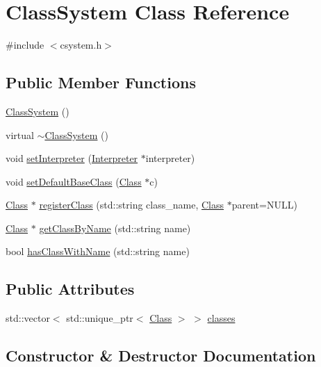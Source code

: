 \hypertarget{classClassSystem}{}\section{Class\+System Class Reference}
\label{classClassSystem}


{\ttfamily \#include $<$csystem.\+h$>$}

\subsection*{Public Member Functions}
\begin{DoxyCompactItemize}
\item 
\hyperlink{classClassSystem_aaaec70fea8c72ed8c47bfb4de3fc4b46}{Class\+System} ()
\item 
virtual \hyperlink{classClassSystem_a9b1842899a13f28ca47cf24287dc0616}{$\sim$\+Class\+System} ()
\item 
void \hyperlink{classClassSystem_ad54dfb82875034ec728a2e417108f164}{set\+Interpreter} (\hyperlink{classInterpreter}{Interpreter} $\ast$interpreter)
\item 
void \hyperlink{classClassSystem_a10283c2e4e7cc89b213f6a32a0d709c1}{set\+Default\+Base\+Class} (\hyperlink{classClass}{Class} $\ast$c)
\item 
\hyperlink{classClass}{Class} $\ast$ \hyperlink{classClassSystem_a02f4790dd9b8fa8808a4e17f1e152281}{register\+Class} (std\+::string class\+\_\+name, \hyperlink{classClass}{Class} $\ast$parent=N\+U\+LL)
\item 
\hyperlink{classClass}{Class} $\ast$ \hyperlink{classClassSystem_a4b88087eed035dc1f6100850c933ae84}{get\+Class\+By\+Name} (std\+::string name)
\item 
bool \hyperlink{classClassSystem_aa3e6fdac5739091d3f48dbe2b8c9db46}{has\+Class\+With\+Name} (std\+::string name)
\end{DoxyCompactItemize}
\subsection*{Public Attributes}
\begin{DoxyCompactItemize}
\item 
std\+::vector$<$ std\+::unique\+\_\+ptr$<$ \hyperlink{classClass}{Class} $>$ $>$ \hyperlink{classClassSystem_afdfbb54eb10abf323371cb9bb4f639a2}{classes}
\end{DoxyCompactItemize}


\subsection{Constructor \& Destructor Documentation}
\mbox{\label{classClassSystem_aaaec70fea8c72ed8c47bfb4de3fc4b46}} 
